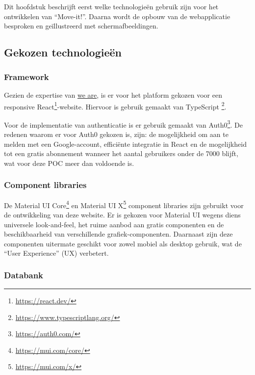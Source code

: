 \chapter{}%
\label{ch:proofofconcept}

Dit hoofdstuk beschrijft eerst welke technologieën gebruik zijn voor het ontwikkelen van ``Move-it!''. Daarna wordt de opbouw van de webapplicatie besproken en geïllustreerd met schermafbeeldingen.

\section{Gekozen technologieën}

\subsection{Framework}

Gezien de expertise van \href{https://www.we-are.be/}{we are}, is er voor het platform gekozen voor een responsive React\footnote{\href{https://react.dev/}{https://react.dev/}}-website. Hiervoor is gebruik gemaakt van TypeScript \footnote{\href{https://www.typescriptlang.org/}{https://www.typescriptlang.org/}}.

Voor de implementatie van authenticatie is er gebruik gemaakt van Auth0\footnote{\href{https://auth0.com/}{https://auth0.com/}}. De redenen waarom er voor Auth0 gekozen is, zijn: de mogelijkheid om aan te melden met een Google-account, efficiënte integratie in React en de mogelijkheid tot een gratis abonnement wanneer het aantal gebruikers onder de 7000 blijft, wat voor deze POC meer dan voldoende is.

\subsection{Component libraries}
De Material UI Core\footnote{\href{https://mui.com/core/}{https://mui.com/core/}} en Material UI X\footnote{\href{https://mui.com/x/}{https://mui.com/x/}} component libraries zijn gebruikt voor de ontwikkeling van deze website. Er is gekozen voor Material UI wegens diens universele look-and-feel, het ruime aanbod aan gratis componenten en de beschikbaarheid van verschillende grafiek-componenten. Daarnaast zijn deze componenten uitermate geschikt voor zowel mobiel als desktop gebruik, wat de ``User Experience'' (UX) verbetert.

\subsection{Databank}

